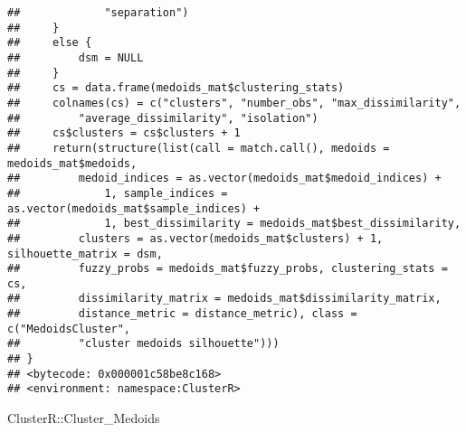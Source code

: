 \documentclass[
]{article}
\newenvironment{Shaded}{\begin{snugshade}}{\end{snugshade}}
\newcommand{\NormalTok}[1]{#1}
\newcommand{\SpecialCharTok}[1]{\textcolor[rgb]{0.00,0.00,0.00}{#1}}
\begin{document}
\begin{verbatim}
##             "separation")
##     }
##     else {
##         dsm = NULL
##     }
##     cs = data.frame(medoids_mat$clustering_stats)
##     colnames(cs) = c("clusters", "number_obs", "max_dissimilarity", 
##         "average_dissimilarity", "isolation")
##     cs$clusters = cs$clusters + 1
##     return(structure(list(call = match.call(), medoids = medoids_mat$medoids, 
##         medoid_indices = as.vector(medoids_mat$medoid_indices) + 
##             1, sample_indices = as.vector(medoids_mat$sample_indices) + 
##             1, best_dissimilarity = medoids_mat$best_dissimilarity, 
##         clusters = as.vector(medoids_mat$clusters) + 1, silhouette_matrix = dsm, 
##         fuzzy_probs = medoids_mat$fuzzy_probs, clustering_stats = cs, 
##         dissimilarity_matrix = medoids_mat$dissimilarity_matrix, 
##         distance_metric = distance_metric), class = c("MedoidsCluster", 
##         "cluster medoids silhouette")))
## }
## <bytecode: 0x000001c58be8c168>
## <environment: namespace:ClusterR>
\end{verbatim}

\begin{Shaded}
\begin{Highlighting}[]
\NormalTok{ClusterR}\SpecialCharTok{::}\NormalTok{Cluster\_Medoids}
\end{Highlighting}
\end{Shaded}
\end{document}
